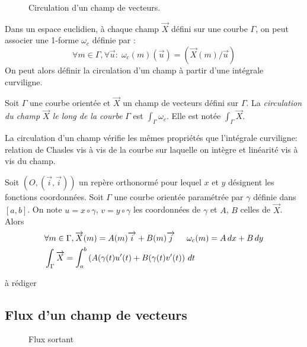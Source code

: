 \begin{figure}
 \centering

\caption{Circulation d'un champ de vecteurs.}
\label{fig:C2269_6}
\end{figure}
Dans un espace euclidien, à chaque champ $\overrightarrow X$ défini sur une courbe $\Gamma$, on peut associer une 1-forme $\omega_c$ définie  par :
\begin{displaymath}
 \forall m\in \Gamma,  \forall \overrightarrow u :\;
\omega_c(m)(\overrightarrow u ) = (\overrightarrow X (m)/ \overrightarrow u)
\end{displaymath}
 On peut alors définir la circulation d'un champ à partir d'une intégrale curviligne.
\begin{defi}
 Soit $\Gamma$ une courbe orientée et $\overrightarrow X$ un champ de vecteurs défini sur $\Gamma$. La \emph{circulation du champ $\overrightarrow X$ le long de la courbe} $\Gamma$ est $\int_\Gamma \omega_c$. Elle est notée $\int_{\Gamma}\overrightarrow X$.
\end{defi}
\begin{rem}
 La circulation d'un champ vérifie les mêmes propriétés  que l'intégrale curviligne: relation de Chasles vis à vis de la courbe sur laquelle on intègre et linéarité vis à vis du champ.
\end{rem}
\begin{prop}
 Soit $(O,(\overrightarrow{i},\overrightarrow{i}))$ un repère orthonormé pour lequel $x$ et $y$ désignent les fonctions coordonnées. Soit $\Gamma$ une courbe orientée paramétrée par $\gamma$ définie dans $[a,b]$. On note $u=x\circ \gamma$, $v=y\circ \gamma$ les coordonnées de $\gamma$ et $A$, $B$ celles de $\overrightarrow X$. Alors
\begin{align*}
 &\forall m\in \Gamma, \overrightarrow X(m) = A(m)\overrightarrow i + B(m)\overrightarrow j\hspace{0.5cm}
\omega_c(m) = A\,dx +B\,dy \\
& \int_\Gamma \overrightarrow X = \int_a^b \left(A(\gamma(t)u'(t)+B(\gamma(t)v'(t) \right)\,dt  
\end{align*}
\end{prop}
\begin{demo}
 à rédiger
\end{demo}

\subsection{Flux d'un champ de vecteurs}
\begin{figure}
 \centering

\caption{Flux sortant}
\label{fig:C2269_7}
\end{figure}

